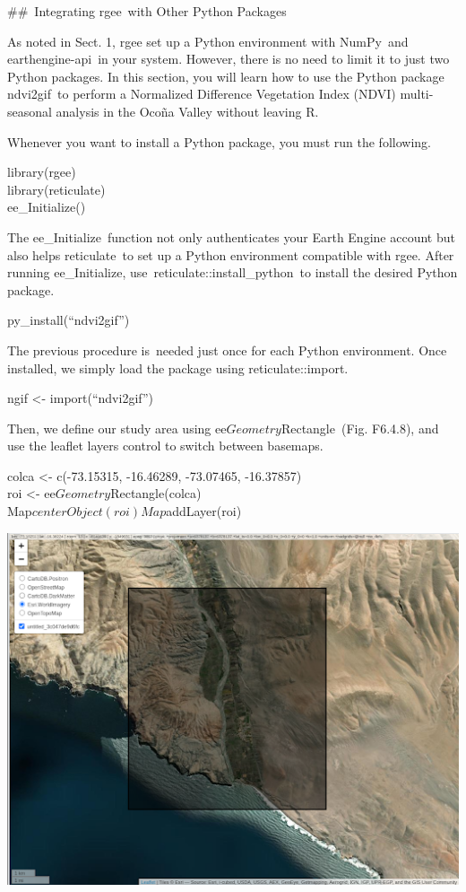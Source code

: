 \documentclass[
  letterpaper,
  DIV=11,
  numbers=noendperiod]{scrreprt}
\begin{document}
\#\#~Integrating rgee~with Other Python Packages

As noted in Sect. 1, rgee set up a Python environment with NumPy~and
earthengine-api~in your system. However, there is no need to limit it to
just two Python packages. In this section, you will learn how to use the
Python package ndvi2gif~to perform a Normalized Difference Vegetation
Index (NDVI) multi-seasonal analysis in the Ocoña Valley without leaving
R.

Whenever you want to install a Python package, you must run the
following.

library(rgee)\\
library(reticulate)\\
ee\_Initialize()

The ee\_Initialize~function not only authenticates your Earth Engine
account but also helps reticulate~to set up a Python environment
compatible with rgee. After running ee\_Initialize,
use~reticulate::install\_python~to install the desired Python package.

py\_install(``ndvi2gif'')

The previous procedure is~needed just once for each Python environment.
Once installed, we simply load the package using reticulate::import.

ngif \textless- import(``ndvi2gif'')

Then, we define our study area using ee\(Geometry\)Rectangle~(Fig.
F6.4.8), and use the leaflet layers control to switch between basemaps.

colca \textless- c(-73.15315, -16.46289, -73.07465, -16.37857)\\
roi \textless- ee\(Geometry\)Rectangle(colca)\\
Map\(centerObject(roi) Map\)addLayer(roi)

\includegraphics{./F6/image59.png}
\end{document}

